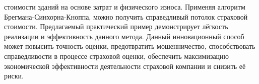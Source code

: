 \documentclass[12pt]{scrartcl}
\begin{document}
стоимости зданий на основе затрат и физического износа. Применяя алгоритм Брегмана-Синхорна-Кноппа, можно получить справедливый потолок страховой стоимости. Предлагаемый практический пример демонстрирует лёгкость реализации и эффективность данного метода. Данный инновационный способ может повысить точность оценки, предотвратить мошенничество, способствовать справедливости в процессе страховой оценки, обеспечить максимизацию экономической эффективности деятельности страховой компании и снизить её риски.





\printbibliography
\end{document}
